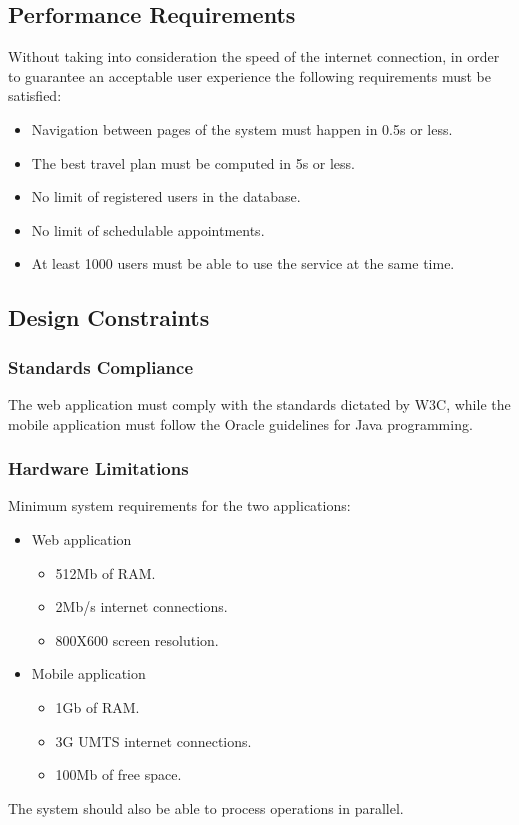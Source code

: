 \subsection{Performance Requirements}
Without taking into consideration the speed of the internet connection, in order to guarantee an acceptable user experience the following  requirements must be satisfied:
\begin{itemize}
\item Navigation between pages of the system must happen in 0.5s or less.
\item The  best travel plan must be computed in 5s or less.
\item No limit of registered users in the database.
\item No limit of schedulable appointments.
\item At least 1000 users must be able to use the service at the same time. 
\end{itemize}
\newpage
\subsection{Design Constraints}
\subsubsection{Standards Compliance}
The web application must comply with the standards dictated by W3C, while the mobile application must follow the Oracle guidelines for Java programming.
\subsubsection{Hardware Limitations}
\label{sec:HardwareLimitations}
Minimum system requirements for the two applications:
\begin{itemize}
\item Web application
\begin{itemize}
\item 512Mb of RAM.
\item 2Mb/s internet connections.
\item 800X600 screen resolution.
\end{itemize}
\item Mobile application
\begin{itemize}
\item 1Gb of RAM.
\item 3G UMTS internet connections.
\item 100Mb of free space.
\end{itemize}
\end{itemize}
The system should also be able to process operations in parallel.
\clearpage
